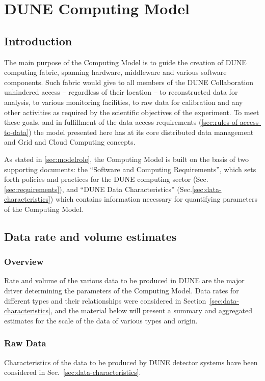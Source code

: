 \section{DUNE Computing Model}
\label{sec:computing_model}

\subsection{Introduction}
The main purpose of the Computing Model is to guide the creation of DUNE computing fabric, spanning
hardware, middleware and various software components. Such fabric would give to all members of the DUNE
Collaboration unhindered access -- regardless of their location -- to reconstructed data for analysis, to various monitoring facilities,
to raw data for calibration and any other activities as required by the scientific objectives of the experiment. To meet these goals,
and in fulfillment of the data access requirements (\ref{sec:rules-of-access-to-data})
the model presented here has at  its core distributed data management and Grid and Cloud Computing concepts.

As stated in \ref{sec:modelrole}, the Computing Model is built on the basis of two supporting documents: the
``Software and Computing Requirements'', which sets forth policies and practices for the DUNE computing sector
(Sec.\ref{sec:requirements}), and ``DUNE Data Characteristics'' (Sec.\ref{sec:data-characteristics}) which contains information
necessary for quantifying parameters of the Computing Model.

\subsection{Data rate and volume estimates}

\subsubsection{Overview}
Rate and volume of the various data to be produced in DUNE are the major driver determining the parameters
of the Computing Model. Data rates for different types and their relationships were considered in
Section~\ref{sec:data-characteristics},
and the material below will present a summary and aggregated estimates for the scale of the data of various types
and origin.

\subsubsection{Raw Data}
Characteristics of the data to be produced by DUNE detector systems have been considered in
Sec.~\ref{sec:data-characteristics}.

